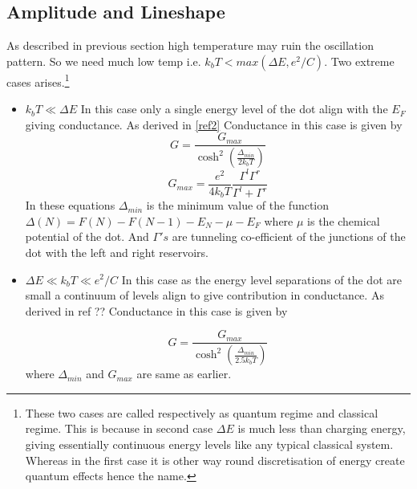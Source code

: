 \documentclass[a4paper]{report}
\begin{document}
    \subsection*{Amplitude and Lineshape}
      \hspace{10pt} As described in previous section high temperature may ruin the oscillation pattern. So we need much low temp i.e. $k_{b} T < max(\Delta E,e^2/C)$. Two extreme cases arises.\footnote{These two cases are called respectively as quantum regime and classical regime. This is because in second case $\Delta E $ is much less than charging energy, giving essentially continuous energy levels like any typical classical system. Whereas  in the first case it is other way round discretisation of energy create quantum effects hence the name.}
      \begin{itemize}
        \item $k_{b} T \ll \Delta E$ In this case only a single energy level of the dot align with the $E_{F}$ giving conductance. As derived in \ref{ref2} Conductance in this case is given by
        \begin{equation}
          G = \dfrac{G_{max} }{\cosh^2 \left(\frac{\Delta_{min}}{2k_{b}T} \right)}
        \end{equation}
        \begin{equation}
          G_{max} = \dfrac{e^2}{4k_{b} T} \dfrac{\Gamma^l \Gamma^r}{\Gamma^l + \Gamma^r}
        \end{equation} 
        In these equations $\Delta_{min}$ is the minimum value of the function $\Delta(N) = F(N) -F(N-1) -E_{N} -\mu -E_{F} $ where $\mu$ is the chemical potential of the dot. And $\Gamma 's$ are tunneling co-efficient of the junctions of the dot with the left and right reservoirs. 

        \item $\Delta E \ll k_{b} T \ll e^2/C$ In this case as the energy level separations of the dot are small a continuum of levels align to give contribution in conductance. As derived in ref ?? Conductance in this case is given by

        \begin{equation}
          G = \dfrac{G_{max}}{\cosh^2 \left(\frac{\Delta_{min}}{2.5k_{b}T}\right)} 
        \end{equation}
        where $\Delta_{min}$ and $G_{max}$ are same as earlier.
      \end{itemize}
\end{document}
